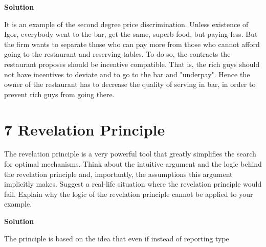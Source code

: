 \documentclass[a4paper]{article}
\begin{document}
		\textbf{Solution}
		
		
		It is an example of the second degree price discrimination. Unless existence of Igor, everybody went to the bar, get the same, superb food, but paying less. But the firm wants to separate those who can pay more from those who cannot afford going to the restaurant and reserving tables. To do so, the contracts the restaurant proposes should be incentive compatible. That is, the rich guys should not have incentives to deviate and to go to the bar and "underpay". Hence the owner of the restaurant has to decrease the quality of serving in bar, in order to prevent rich guys from going there.
		
		\section*{7 Revelation Principle}
			The revelation principle is a very powerful tool that greatly simplifies the search for optimal
			mechanisms. Think about the intuitive argument and the logic behind the revelation principle
			and, importantly, the assumptions this argument implicitly makes. Suggest a real-life situation
			where the revelation principle would fail. Explain why the logic of the revelation principle
			cannot be applied to your example.
			
			
			\textbf{Solution}
			
			The principle is based on the idea that even if instead of reporting type 
\end{document}
